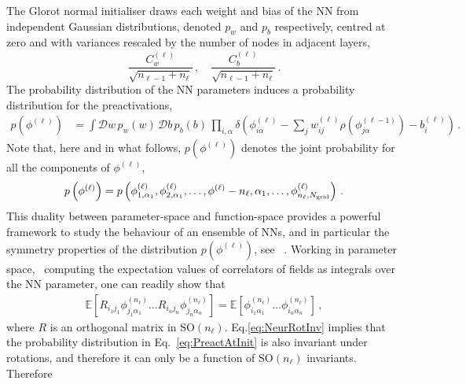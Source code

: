 \documentclass[11pt]{article}
\begin{document}
The Glorot normal initialiser draws each weight and bias of the NN from independent Gaussian
distributions, denoted $p_w$ and $p_b$ respectively, centred at zero and with variances 
rescaled by the number of nodes in adjacent layers, 
\begin{equation}
    \label{eq:RescaledGlorotVariances}
    \frac{C^{(\ell)}_{w}}{\sqrt{n_{\ell-1} + n_{\ell}}}\, , 
    \quad \frac{C^{(\ell)}_{b}}{\sqrt{n_{\ell-1} + n_{\ell}}}\, .
\end{equation}
The probability distribution of the NN parameters induces a probability distribution for the 
preactivations, 
\begin{align}
    \label{eq:PreactAtInit}
    p\left(\phi^{(\ell)}\right) 
      &= \int \mathcal{D}w\, p_w(w)\,
        \mathcal{D}b\, p_b(b)\, \prod_{i,\alpha} 
        \delta\left(
          \phi^{(\ell)}_{i\alpha} - \sum_{j} w^{(\ell)}_{ij} 
          \rho\left(\phi^{(\ell-1)}_{j\alpha}\right) 
          - b^{(\ell)}_i 
          \right)\, .
\end{align}
Note that, here and in what follows, $p(\phi^{(\ell)})$ denotes the joint probability for all the components 
of $\phi^{(\ell)}$, 
\begin{align}
    \label{eq:ExplIndices}
    p\left(\phi^{(\ell)}\right) = p\left(\phi^{(\ell)}_{1,\alpha_1}, \phi^{(\ell)}_{2,\alpha_1}, \ldots, 
        \phi^{(\ell)}-{n_\ell,\alpha_1}, \ldots, 
        \phi^{(\ell)}_{n_\ell,N_{\mathrm{grid}}}\right)\, .
\end{align}
This duality between parameter-space and function-space provides a powerful framework to study 
the behaviour of an ensemble of NNs, and in particular the symmetry properties of the distribution
$p(\phi^{(\ell)})$, see \eg~\cite{Maiti:2021fpy}. Working in parameter space, \ie\ computing the 
expectation values of correlators of fields as integrals over the NN parameter, one can readily 
show that 
\begin{align}
    \label{eq:NeurRotInv}
    \mathbb{E}\left[
        R_{i_1j_1} \phi^{(n_\ell)}_{j_1 \alpha_1} \ldots
        R_{i_nj_n} \phi^{(n_\ell)}_{j_n \alpha_n}
    \right] = 
    \mathbb{E}\left[
        \phi^{(n_\ell)}_{i_1 \alpha_1} \ldots
        \phi^{(n_\ell)}_{i_n \alpha_n}
    \right]\, ,
\end{align}
where $R$ is an orthogonal matrix in $\text{SO}(n_{\ell})$. Eq.\eqref{eq:NeurRotInv} implies 
that the probability distribution in Eq.~\eqref{eq:PreactAtInit} is also invariant under rotations, 
and therefore it can only be a function of $\text{SO}(n_{\ell})$ invariants. Therefore 
\end{document}
